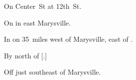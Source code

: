 

\begin{LocationList}

On  Center~St at 12th~St.

On  in east Marysville.

In  on  35~miles west of Marysville, east of .

\Location{\TruckStop \Gas \Rest}
By  north of [.]

Off  just southeast of Marysville.

\end{LocationList}
